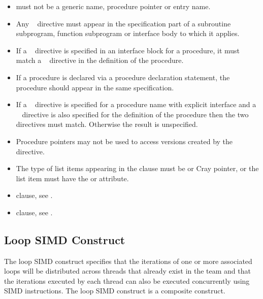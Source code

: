 \begin{itemize}
\fortranspecificstart
\item {} must not be a generic name, procedure pointer or entry name.

\item Any ~ directive must appear in the specification part of a subroutine 
subprogram, function subprogram or interface body to which it applies.

\item If a ~ directive is specified in an interface block for a procedure, it 
must match a ~ directive in the definition of the procedure.

\item If a procedure is declared via a procedure declaration statement, the procedure 
 should appear in the same specification. 

\item If a ~ directive is specified for a procedure name with explicit 
interface and a ~ directive is also specified for the definition of the 
procedure then the two ~ directives must match. Otherwise the result 
is unspecified.

\item Procedure pointers may not be used to access versions created by the ~ directive.

\item The type of list items appearing in the  clause must be  or Cray 
pointer, or the list item must have the  or  attribute.
\fortranspecificend
\end{itemize}

\crossreferences
\begin{itemize}
\item {} clause, see 
.

\item {} clause, see 
.
\end{itemize}










\begin{samepage}
\subsection{Loop SIMD Construct}
\label{subsec:Loop SIMD Construct}
\summary
The loop SIMD construct specifies that the iterations of one or more associated loops will be distributed across threads that already exist in the team and that the iterations executed by each thread can also be executed concurrently using SIMD instructions. The loop SIMD construct is a composite construct.
\end{samepage}

